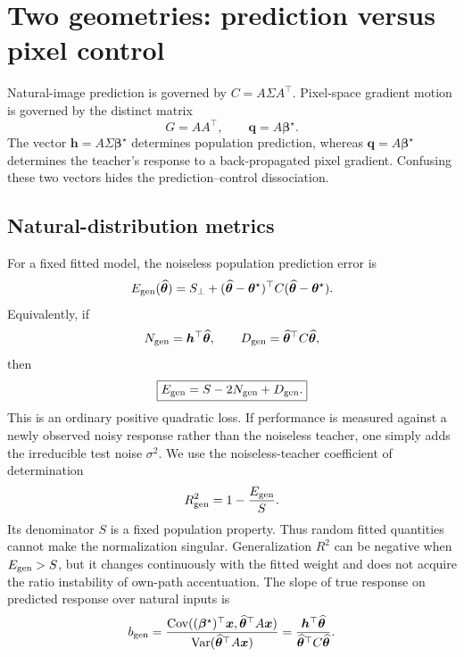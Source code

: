 \documentclass[11pt]{article}
\newcommand{\Var}{\operatorname{Var}}
\newcommand{\Cov}{\operatorname{Cov}}
\newcommand{\bstar}{\bm\beta^{\star}}
\newcommand{\that}{\widehat{\bm\theta}}
\newcommand{\tstar}{\bm\theta^{\star}}
\begin{document}
\section{Two geometries: prediction versus pixel control}

Natural-image prediction is governed by $C=A\Sigma A^{\top}$.  Pixel-space
gradient motion is governed by the distinct matrix
\begin{equation}
  G=AA^{\top},\qquad \bm q=A\bstar.
  \label{eq:control-geometry}
\end{equation}
The vector $\bm h=A\Sigma\bstar$ determines population prediction, whereas
$\bm q=A\bstar$ determines the teacher's response to a back-propagated pixel
gradient.  Confusing these two vectors hides the prediction--control
dissociation.

\subsection{Natural-distribution metrics}

For a fixed fitted model, the noiseless population prediction error is
\begin{equation}
  E_{\rm gen}(\that)
  =S_{\perp}+(\that-\tstar)^{\top}C(\that-\tstar).
  \label{eq:exact-gen-error}
\end{equation}
Equivalently, if
\begin{equation}
  N_{\rm gen}=\bm h^{\top}\that,
  \qquad D_{\rm gen}=\that^{\top}C\that,
\end{equation}
then
\begin{equation}
  \boxed{E_{\rm gen}=S-2N_{\rm gen}+D_{\rm gen}.}
  \label{eq:gen-quadratic-decomposition}
\end{equation}
This is an ordinary positive quadratic loss.  If performance is measured
against a newly observed noisy response rather than the noiseless teacher,
one simply adds the irreducible test noise $\sigma^2$.
We use the noiseless-teacher coefficient of determination
\begin{equation}
  R^2_{\rm gen}=1-\frac{E_{\rm gen}}{S}.
  \label{eq:r2-gen}
\end{equation}
Its denominator $S$ is a fixed population property.  Thus random fitted
quantities cannot make the normalization singular.  Generalization $R^2$ can
be negative when $E_{\rm gen}>S$, but it changes continuously with the fitted
weight and does not acquire the ratio instability of own-path accentuation.
The slope of true response on predicted response over natural inputs is
\begin{equation}
  b_{\rm gen}
  =\frac{\Cov((\bstar)^{\top}\bm x,\that^{\top}A\bm x)}
         {\Var(\that^{\top}A\bm x)}
  =\frac{\bm h^{\top}\that}{\that^{\top}C\that}.
  \label{eq:slope-gen-exact}
\end{equation}
\end{document}
